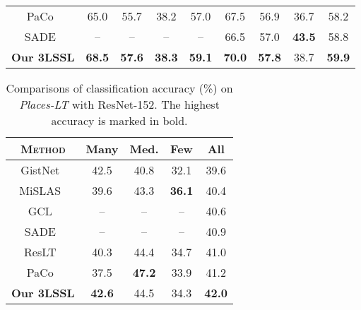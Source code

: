 \documentclass[10pt,journal,compsoc]{IEEEtran}
\begin{document}
\begin{table*}[t]
\begin{tabular}{c|cccc|cccc}
PaCo~\cite{Cui_2021_ICCV}                  & 65.0          & 55.7          & 38.2          & 57.0          & 67.5          & 56.9          & 36.7          & 58.2          \\
SADE~\cite{SADEnips22}                     & --            & --            & --            & --            & 66.5          & 57.0          & \textbf{43.5}          & 58.8          \\
\hline
\textbf{Our 3LSSL}                         & \textbf{68.5} & \textbf{57.6} & \textbf{38.3} & \textbf{59.1} & \textbf{70.0} & \textbf{57.8} & {38.7} & \textbf{59.9} \\
\bottomrule           
\end{tabular}
\label{table:resultsImageNetLT}
\end{table*}

\begin{table}[t]
\centering
\small
\renewcommand\arraystretch{1.1}
\caption{\small Comparisons of classification accuracy (\%) on \emph{Places-LT} with ResNet-152. The highest accuracy is marked in bold.}
\begin{tabular}{c|cccc}
\toprule
\textsc{Method}                   & \textsf{Many} & \textsf{Med.} & \textsf{Few} & \textsf{All} \\
\hline
GistNet~\cite{gistnet21}          & 42.5          & 40.8          & 32.1         & 39.6   \bigstrut[t] \\
MiSLAS~\cite{calibrationcvpr2021} & 39.6          & 43.3          & \textbf{36.1}         & 40.4         \\
GCL~\cite{GCLcvpr22}              & --            & --            & --           & 40.6         \\
SADE~\cite{SADEnips22}            & --            & --            & --           & 40.9         \\
ResLT~\cite{ResLTPAMI}            & 40.3          & 44.4          & 34.7         & 41.0         \\
PaCo~\cite{Cui_2021_ICCV}         & 37.5          & \textbf{47.2}          & 33.9         & 41.2         \\
\hline
\textbf{Our 3LSSL}                &         \textbf{42.6}      &        44.5       &      34.3        &   \textbf{42.0}  \\
\bottomrule           
\end{tabular}
\label{table:resultsPlacesLT}
\end{table}
\end{document}
